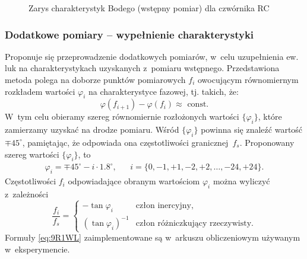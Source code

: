 \documentclass[paper=a4,DIV=12]{lpas}
\newcommand{\degree}{^{\circ}}
\begin{document}
\begin{appendices}
  \begin{figure}[H]
    \centering
    
    \caption{Zarys charakterystyk Bodego (wstępny pomiar) dla czwórnika RC}
    \label{fig:UIR99}
  \end{figure}

  \subsubsection{Dodatkowe pomiary -- wypełnienie charakterystyki}
  \label{sec:2C7WK}

  Proponuje się przeprowadzenie dodatkowych pomiarów, w~celu uzupełnienia ew. luk
  na charakterystykach uzyskanych z~pomiaru wstępnego. Przedstawiona metoda
  polega na doborze punktów pomiarowych $f_i$ owocującym równomiernym rozkładem
  wartości $\varphi_i$ na charakterystyce fazowej, tj. takich, że:
  \begin{equation}
    \varphi(f_{i+1}) - \varphi(f_i) \approx \text{ const}.
    \label{eq:BMOQL}
  \end{equation}
  W~tym celu obieramy szereg równomiernie rozłożonych wartości $\{\varphi_i\}$,
  które zamierzamy uzyskać na drodze pomiaru. Wśród $\{\varphi_i\}$ powinna się
  znaleźć wartość $\mp 45\degree$, pamiętając, że odpowiada ona
  częstotliwości granicznej~$f_s$. Proponowany szereg wartości $\{\varphi_i\}$, to
  \begin{equation}
    \begin{aligned}
      & \varphi_i = \mp 45\degree - i \cdot 1.8\degree, && i=\{0, -1,+1,-2,+2,\dots,-24,+24\}. &
    \end{aligned}
    \label{eq:0ZBDF}
  \end{equation}
  Częstotliwości $f_i$ odpowiadające obranym wartościom $\varphi_i$ można wyliczyć
  z~zależności
  \begin{equation}
    \frac{f_i}{f_s} = \begin{cases}
      - \tan{\varphi_i} & \text{człon inercyjny}, \\
      (\tan{\varphi_i})^{-1} & \text{człon różniczkujący rzeczywisty}.
    \end{cases}
    \label{eq:9R1WL}
  \end{equation}
  Formuły \eqref{eq:9R1WL} zaimplementowane są w~arkuszu obliczeniowym używanym
  w~eksperymencie.


\end{appendices}
\end{document}
